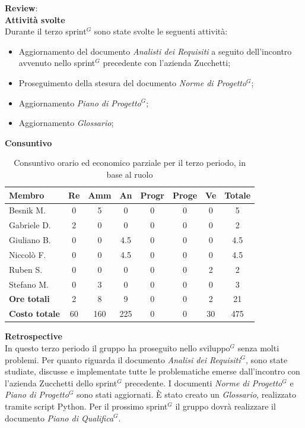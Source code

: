 \documentclass[a4paper,10pt]{article}
\begin{document}
\textbf{Review}: \\
\textbf{Attività svolte}\\
Durante il terzo sprint$^G$ sono state svolte le seguenti attività:
\begin{itemize}
  \item Aggiornamento del documento \textit{Analisti dei Requisiti} a seguito dell'incontro avvenuto nello sprint$^G$ precedente con l'azienda Zucchetti;
  \item Proseguimento della stesura del documento \textit{Norme di Progetto$^G$};
  \item Aggiornamento \textit{Piano di Progetto$^G$};
  \item Aggiornamento \textit{Glossario};
\end{itemize}
\textbf{Consuntivo}
\begin{table}[H]
\centering
\begin{tabular}{|l|c|c|c|c|c|c|c|}
\hline
\textbf{Membro} & \textbf{Re} & \textbf{Amm} & \textbf{An} & \textbf{Progr} & \textbf{Proge} & \textbf{Ve} & \textbf{Totale} \\
\hline
Besnik M.  & 0 & 5 & 0 & 0 & 0 & 0 & 5 \\
Gabriele D. & 2 & 0 & 0 & 0 & 0 & 0 & 2 \\
Giuliano B. & 0 & 0 & 4.5 & 0 & 0 & 0 & 4.5 \\
Niccolò F.  & 0 & 0 & 4.5 & 0 & 0 & 0 & 4.5 \\
Ruben S. & 0 & 0 & 0 & 0 & 0 & 2 & 2 \\
Stefano M. & 0 & 3 & 0 & 0 & 0 & 0 & 3 \\
\hline
\textbf{Ore totali} & 2 & 8 & 9 & 0 & 0 & 2 & 21 \\
\hline
\textbf{Costo totale} & 60 & 160 & 225 & 0 & 0 & 30 & 475 \\
\hline
\end{tabular}
\caption{Consuntivo orario ed economico parziale per il terzo periodo, in base al ruolo}
\end{table}

\textbf{Retrospective} \\
In questo terzo periodo il gruppo ha proseguito nello sviluppo$^G$ senza molti problemi. Per quanto riguarda il documento \textit{Analisi dei Requisiti$^G$}, sono state studiate, discusse e implementate tutte le problematiche emerse dall'incontro con l'azienda Zucchetti dello sprint$^G$ precedente. I documenti \textit{Norme di Progetto$^G$} e \textit{Piano di Progetto$^G$} sono stati aggiornati. È stato creato un \textit{Glossario}, realizzato tramite script Python. Per il prossimo sprint$^G$ il gruppo dovrà realizzare il documento \textit{Piano di Qualifica$^G$}.
\end{document}
